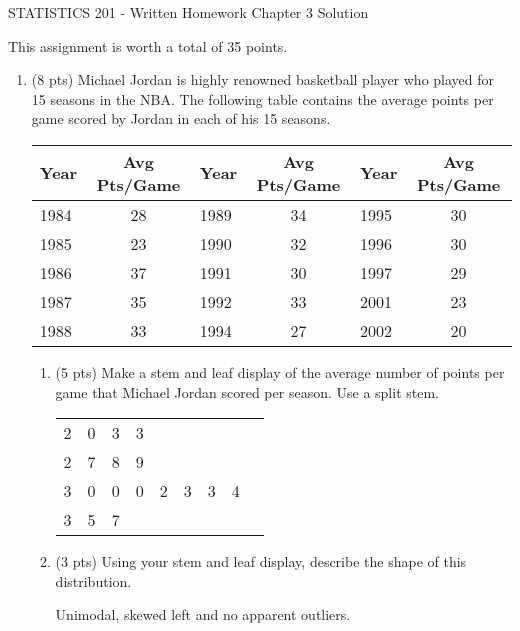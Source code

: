 \documentclass{article}[11pt]
\begin{document}
\begin{center}
{\Large STATISTICS 201 - Written Homework Chapter 3 Solution}\\[3mm]
\end{center}

\noindent 
This assignment is worth a total of 35 points.

\begin{enumerate}

\item (8 pts) Michael Jordan is highly renowned basketball player who played for 15 seasons in the NBA.  The following table contains the average points per game scored by Jordan in each of his 15 seasons.

\begin{center}
\begin{tabular}{|l|c||l|c||l|c|} \hline
Year & Avg Pts/Game & Year & Avg Pts/Game & Year & Avg Pts/Game 
\\ \hline
1984 & 28 & 1989 & 34 & 1995 & 30 \\
1985 & 23 & 1990 & 32 & 1996 & 30 \\
1986 & 37 & 1991 & 30 & 1997 & 29 \\
1987 & 35 & 1992 & 33 & 2001 & 23 \\
1988 & 33 & 1994 & 27 & 2002 & 20 \\ \hline
\end{tabular}
\end{center}

\begin{enumerate}
\item (5 pts) Make a stem and leaf display of the average number of points per game that Michael Jordan scored per season.  Use a split stem. \\
\begin{center}
\begin{tabular}{c|cccccccc}
2 & 0 & 3 & 3 \\ 
2 & 7 & 8 & 9 \\
3 & 0 & 0 & 0 & 2 & 3 & 3 & 4 \\
3 & 5 & 7 \\ 
\end{tabular}
\end{center}

\item (3 pts) Using your stem and leaf display, describe the shape of this distribution.

Unimodal, skewed left and no apparent outliers.
\end{enumerate}


\end{enumerate}
\end{document}
